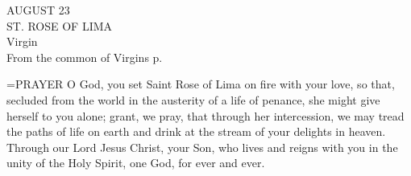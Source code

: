 \begin{center}\normalsize AUGUST 23\\
\footnotesize ST. ROSE OF LIMA\\
\footnotesize Virgin\\
\footnotesize From the common of Virgins p. \\
\end{center}

\hangindent=\parindent \small{PRAYER 
O God, you set Saint Rose of Lima on fire with your love,
so that, secluded from the world
in the austerity of a life of penance,
she might give herself to you alone;
grant, we pray, that through her intercession,
we may tread the paths of life on earth
and drink at the stream of your delights in heaven.
Through our Lord Jesus Christ, your Son,
who lives and reigns with you in the unity of the Holy Spirit,
one God, for ever and ever.\\}
 
